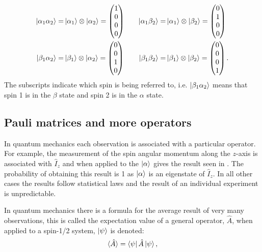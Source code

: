 \begin{align}\label{eqn:2spinstates}
\ket{\alpha_{1}\alpha_{2}} =& \ket{\alpha_1} \otimes \ket{\alpha_2} = \begin{pmatrix}
  1\\
  0\\
  0\\
  0
\end{pmatrix} &\quad
\ket{\alpha_{1}\beta_{2}} =& \ket{\alpha_1} \otimes \ket{\beta_2} = \begin{pmatrix}
  0\\
  1\\
  0\\
  0
\end{pmatrix}\\
\ket{\beta_{1}\alpha_{2}} =& \ket{\beta_1} \otimes \ket{\alpha_2} = \begin{pmatrix}
  0\\
  0\\
  1\\
  0
\end{pmatrix} &\quad
\ket{\beta_{1}\beta_{2}} =& \ket{\beta_1} \otimes \ket{\beta_2} = \begin{pmatrix}
  0\\
  0\\
  0\\
  1
\end{pmatrix}.
\end{align}
The subscripts indicate which spin is being referred to, i.e. $\ket{\beta_1\alpha_2}$ means that
spin 1 is in the $\beta$ state and spin 2 is in the $\alpha$ state.

\subsection{Pauli matrices and more operators}

In quantum mechanics each observation is associated with a particular operator. For
example, the measurement of the spin angular momentum along the $z$-axis is associated with
$\hat{I}_z$ and when applied to the $\ket{\alpha}$ gives the result seen in . The
probability of obtaining this result is 1 as $\ket{\alpha}$ is an eigenstate of $\hat{I}_z$. In
all other cases the results follow statistical laws and the result of an individual experiment
is unpredictable.

In quantum mechanics there is a formula for the average result of very many observations, this is
called the expectation value of a general operator, $\hat{A}$, when applied to a spin-1/2 system, $\ket{\psi}$
is denoted:
\begin{equation}
  \langle\hat{A}\rangle = \bra{\psi}\hat{A}\ket{\psi},
\end{equation}

